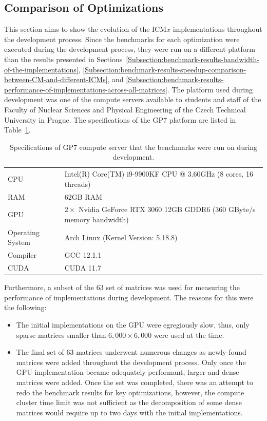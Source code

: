 \subsection{Comparison of Optimizations \TO}
This section aims to show the evolution of the ICM$ x $ implementations throughout the development process. Since the benchmarks for each optimization were executed during the development process, they were run on a different platform than the results presented in Sections~\ref{Subsection:benchmark-results-bandwidth-of-the-implementations}, \ref{Subsection:benchmark-results-speedup-comparison-between-CM-and-different-ICMs}, and \ref{Subsection:benchmark-results-performance-of-implementations-across-all-matrices}. The platform used during development was one of the compute servers available to students and staff of the Faculty of Nuclear Sciences and Physical Engineering of the Czech Technical University in Prague. The specifications of the GP7 platform are listed in Table~\ref{Table:benchmark-results-comparison-of-optimizations}.

\begin{table}[h!]
	\centering
	\begin{tabular}{|l|l|}
		\hline
		CPU              & Intel(R) Core(TM) i9-9900KF CPU @ 3.60GHz (8 cores, 16 threads) \\
		RAM              & 62GB RAM \\
		GPU              & $ 2\times $ Nvidia GeForce RTX 3060 12GB GDDR6 (360 GByte/s memory bandwidth) \\
		Operating System & Arch Linux (Kernel Version: 5.18.8) \\
		Compiler         & GCC 12.1.1 \\
		CUDA             & CUDA 11.7 \\ \hline
	\end{tabular}
	\caption{Specifications of GP7 compute server that the benchmarks were run on during development.}
	\label{Table:benchmark-results-comparison-of-optimizations}
\end{table}

Furthermore, a subset of the 63 set of matrices was used for measuring the performance of implementations during development. The reasons for this were the following:

\begin{itemize}
	\item The initial implementations on the GPU were egregiously slow, thus, only sparse matrices smaller than $ 6,000\times 6,000 $ were used at the time.
	\item The final set of 63 matrices underwent numerous changes as newly-found matrices were added throughout the development process. Only once the GPU implementation became adequately performant, larger and dense matrices were added. Once the set was completed, there was an attempt to redo the benchmark results for key optimizations, however, the compute cluster time limit was not sufficient as the decomposition of some dense matrices would require up to two days with the initial implementations.
\end{itemize}

